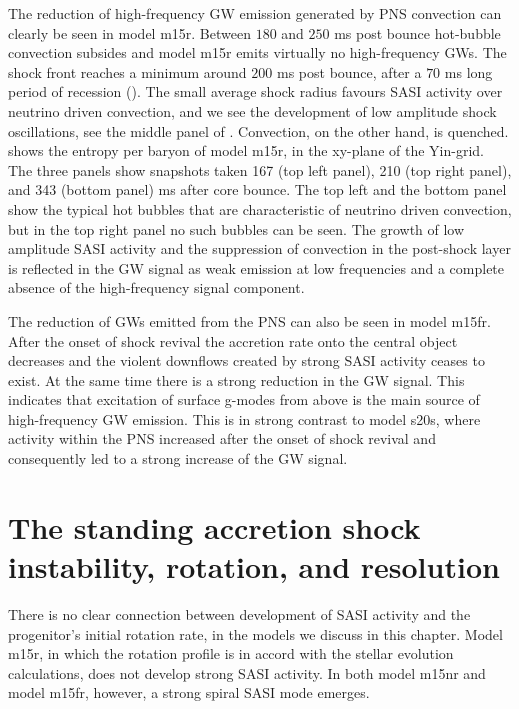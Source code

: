 The reduction of high-frequency GW emission generated by PNS convection can clearly be seen in model
m15r. Between $180$ and $250$ ms post bounce hot-bubble convection subsides and model m15r emits virtually no high-frequency GWs. The shock front reaches a minimum around $200$ ms post bounce, after
a $70$ ms long period of recession (). The small average shock radius favours SASI activity over
neutrino driven convection, and we see the development of low amplitude shock oscillations,
see the middle panel of . Convection, on the other hand, is quenched. 
 shows the entropy per baryon of model m15r, in the xy-plane of the Yin-grid.
The three panels show snapshots taken 167 (top left panel), 210 (top right panel), and 343 (bottom panel) ms
after core bounce. The top left and the bottom panel show the typical hot bubbles that are characteristic of
neutrino driven convection, but in the top right panel no such bubbles can be seen. 
The growth of low amplitude SASI activity and the suppression of convection in the post-shock layer is reflected
in the GW signal as weak emission at low frequencies and a complete absence of the high-frequency signal component.

The reduction of GWs emitted from the PNS can also be seen in model m15fr. After the onset of shock revival
the accretion rate onto the central object decreases and the violent downflows created by strong SASI activity 
ceases to exist. At the same time there is a strong reduction in the GW signal. This indicates
that excitation of surface g-modes from above is the main source of high-frequency GW emission.
This is in strong contrast to model s20s, where activity within the PNS increased after
the onset of shock revival and consequently led to a strong increase of the GW signal.

\section{The standing accretion shock instability, rotation, and resolution}
There is no clear connection between development of SASI activity and the progenitor's initial rotation rate,
in the models we discuss in this chapter. Model m15r, in which the rotation profile is in accord with the stellar
evolution calculations, does not develop strong SASI activity. In both model m15nr and model m15fr, however, a strong spiral SASI mode emerges. 

